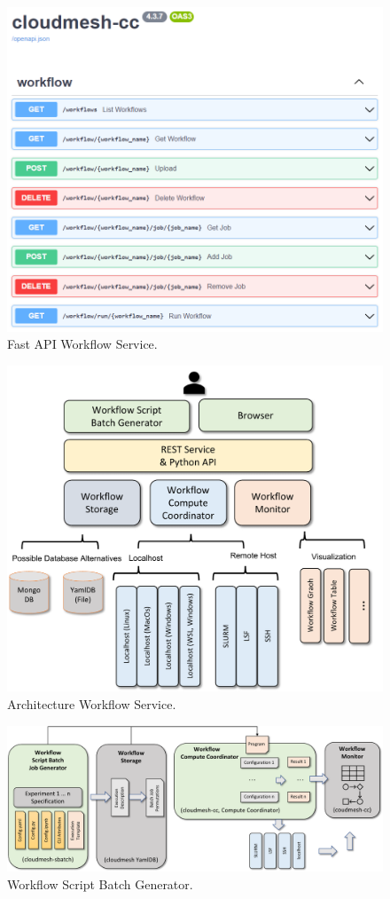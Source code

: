 \documentclass[utf8]{FrontiersinVancouver} %
\begin{document}
\begin{figure}[htb]
\centering\includegraphics[width=0.7\columnwidth]{images/fastapi-service.png}
\caption{Fast API Workflow Service.}
\label{fig:fastapi-cc}
\end{figure}

\begin{figure}[htb]
    \centering
    \includegraphics[width=0.50\columnwidth]{images/cloudmesh-cc-new.pdf}
    \caption{Architecture Workflow Service.}
    \label{fig:cc-2}
\end{figure}

\begin{figure}[htb]
    \centering
    \includegraphics[width=0.70\columnwidth]{images/cloudmesh-sbatch-new.pdf}
    \caption{Workflow Script Batch Generator.}
    \label{fig:cm-sbatch}
\end{figure}
\end{document}
